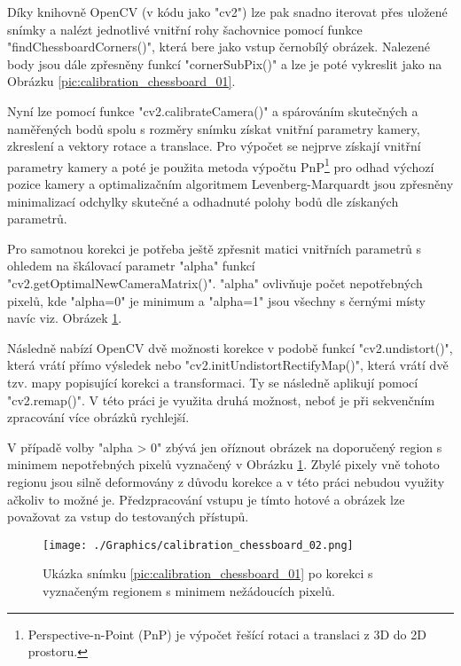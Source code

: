 \documentclass[czech, bc, kky, he, iso690numb]{fasthesis}
\begin{document}
	        	Díky knihovně OpenCV (v kódu jako \command"cv2") lze pak snadno iterovat přes uložené snímky a nalézt jednotlivé vnitřní rohy šachovnice pomocí funkce \command"findChessboardCorners()", která bere jako vstup černobílý obrázek. Nalezené body jsou dále zpřesněny funkcí \command"cornerSubPix()" a lze je poté vykreslit jako na Obrázku \ref{pic:calibration_chessboard_01}.
	        	
	        	Nyní lze pomocí funkce \command"cv2.calibrateCamera()" a spárováním skutečných a naměřených bodů spolu s rozměry snímku získat vnitřní parametry kamery, zkreslení a vektory rotace a translace. Pro výpočet se nejprve získají vnitřní parametry kamery a poté je použita metoda výpočtu PnP\footnote{Perspective-n-Point (PnP) je výpočet řešící rotaci a translaci z 3D do 2D prostoru.} pro odhad výchozí pozice kamery a optimalizačním algoritmem Levenberg-Marquardt jsou zpřesněny minimalizací odchylky skutečné a odhadnuté polohy bodů dle získaných parametrů. 
	        	
	        	Pro samotnou korekci je potřeba ještě zpřesnit matici vnitřních parametrů s ohledem na škálovací parametr \command"alpha" funkcí \command"cv2.getOptimalNewCameraMatrix()". \command"alpha" ovlivňuje počet nepotřebných pixelů, kde \command"alpha=0" je minimum a \command"alpha=1" jsou všechny s černými místy navíc viz. Obrázek \ref{pic:calibration_chessboard_02}.
	        	
	        	Následně nabízí OpenCV dvě možnosti korekce v podobě funkcí \command"cv2.undistort()", která vrátí přímo výsledek nebo \command"cv2.initUndistortRectifyMap()", která vrátí dvě tzv. mapy popisující korekci a transformaci. Ty se následně aplikují pomocí \command"cv2.remap()". V této práci je využita druhá možnost, neboť je při sekvenčním zpracování více obrázků rychlejší.
	        	
	        	V případě volby \command"alpha > 0" zbývá jen oříznout obrázek na doporučený region s minimem nepotřebných pixelů vyznačený v Obrázku \ref{pic:calibration_chessboard_02}. Zbylé pixely vně tohoto regionu jsou silně deformovány z důvodu korekce a v této práci nebudou využity ačkoliv to možné je. Předzpracování vstupu je tímto hotové a obrázek lze považovat za vstup do testovaných přístupů.
	        	
	        		\begin{figure}[h]
	        			\centering
	        			\texttt{[image: ./Graphics/calibration\_chessboard\_02.png]}
	        			\caption{Ukázka snímku \ref{pic:calibration_chessboard_01} po korekci s vyznačeným regionem s minimem nežádoucích pixelů.}
	        			\label{pic:calibration_chessboard_02}
	        		\end{figure}
	        	
\end{document}
